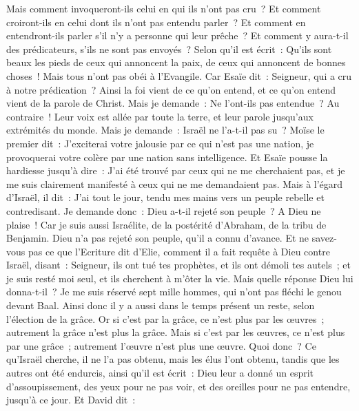 \begin{multicols}{2}
Mais comment invoqueront-ils celui en qui ils n'ont pas cru~? Et comment croiront-ils en celui dont ils n'ont pas entendu parler~? Et comment en entendront-ils parler s'il n'y a personne qui leur prêche~?
Et comment y aura-t-il des prédicateurs, s'ils ne sont pas envoyés~? Selon qu'il est écrit~: Qu'ils sont beaux les pieds de ceux qui annoncent la paix, de ceux qui annoncent de bonnes choses~!
Mais tous n'ont pas obéi à l'Evangile. Car Esaïe dit~: Seigneur, qui a cru à notre prédication~?
Ainsi la foi vient de ce qu'on entend, et ce qu'on entend vient de la parole de Christ.
Mais je demande~: Ne l'ont-ils pas entendue~? Au contraire~! Leur voix est allée par toute la terre, et leur parole jusqu'aux extrémités du monde.
Mais je demande~: Israël ne l'a-t-il pas su~? Moïse le premier dit~: J'exciterai votre jalousie par ce qui n'est pas une nation, je provoquerai votre colère par une nation sans intelligence.
Et Esaïe pousse la hardiesse jusqu'à dire~: J'ai été trouvé par ceux qui ne me cherchaient pas, et je me suis clairement manifesté à ceux qui ne me demandaient pas.
Mais à l'égard d'Israël, il dit~: J'ai tout le jour, tendu mes mains vers un peuple rebelle et contredisant.
\VerseOne{}Je demande donc~: Dieu a-t-il rejeté son peuple~? A Dieu ne plaise~! Car je suis aussi Israélite, de la postérité d'Abraham, de la tribu de Benjamin.
Dieu n'a pas rejeté son peuple, qu'il a connu d'avance. Et ne savez-vous pas ce que l'Ecriture dit d'Elie, comment il a fait requête à Dieu contre Israël, disant~:
Seigneur, ils ont tué tes prophètes, et ils ont démoli tes autels~; et je suis resté moi seul, et ils cherchent à m'ôter la vie.
Mais quelle réponse Dieu lui donna-t-il~? Je me suis réservé sept mille hommes, qui n'ont pas fléchi le genou devant Baal.
Ainsi donc il y a aussi dans le temps présent un reste, selon l'élection de la grâce.
Or si c'est par la grâce, ce n'est plus par les œuvres~; autrement la grâce n'est plus la grâce. Mais si c'est par les œuvres, ce n'est plus par une grâce~; autrement l'œuvre n'est plus une œuvre.
Quoi donc~? Ce qu'Israël cherche, il ne l'a pas obtenu, mais les élus l'ont obtenu, tandis que les autres ont été endurcis,
ainsi qu'il est écrit~: Dieu leur a donné un esprit d'assoupissement, des yeux pour ne pas voir, et des oreilles pour ne pas entendre, jusqu'à ce jour. Et David dit~:

\end{multicols}
